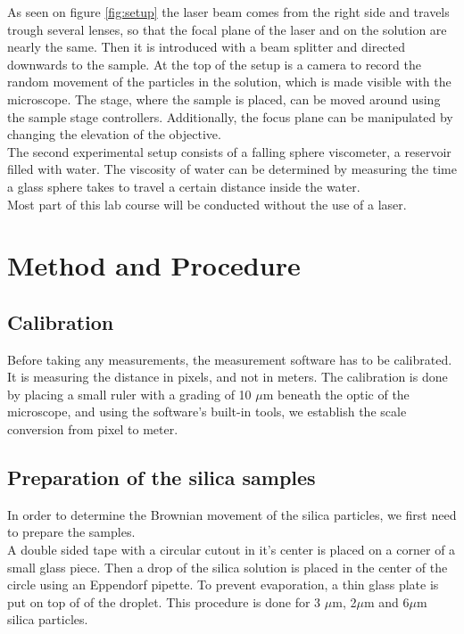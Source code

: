\documentclass{article}
\begin{document}
As seen on figure \ref{fig:setup} the laser beam comes from the right side and travels trough several lenses, so that the focal plane of the laser and on the solution are nearly the same. Then it is introduced with a beam splitter and directed downwards to the sample. At the top of the setup is a camera to record the random movement of the particles in the solution, which is made visible with the microscope. The stage, where the sample is placed, can be moved around using the sample stage controllers. Additionally, the focus plane can be manipulated by changing the elevation of the objective. \\
The second experimental setup consists of a falling sphere viscometer, a reservoir filled with water. The viscosity of water can be determined by measuring the time a glass sphere takes to travel a certain distance inside the water.\\
Most part of this lab course will be conducted without the use of a laser.

\section{Method and Procedure}

\subsection{Calibration}
Before taking any measurements, the measurement software has to be calibrated. It is measuring the distance in pixels, and not in meters. The calibration is done by placing a small ruler with a grading of 10 $\mu$m beneath the optic of the microscope, and using the software's built-in tools, we establish the scale conversion from pixel to meter.

\subsection{Preparation of the silica samples}
In order to determine the Brownian movement of the silica particles, we first need to prepare the samples.\\
A double sided tape with a circular cutout in it's center is placed on a corner of a small glass piece. Then a drop of the silica solution is placed in the center of the circle using an Eppendorf pipette. To prevent evaporation, a thin glass plate is put on top of of the droplet. This procedure is done for 3 $\mu$m, 2$\mu$m and 6$\mu$m silica particles.
\end{document}
